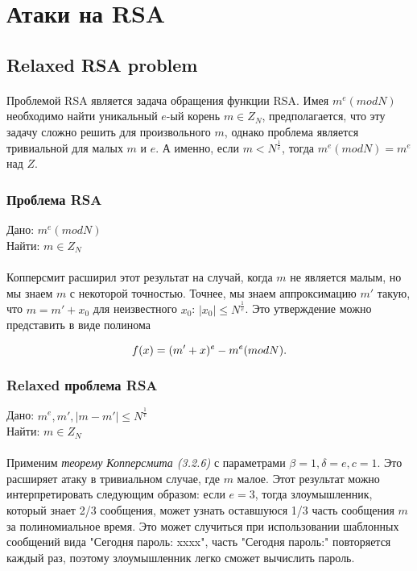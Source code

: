 \section{Атаки на RSA}

\subsection{Relaxed RSA problem}

\paragraph{} Проблемой RSA является задача обращения функции RSA. Имея {$m^e (mod N)$} необходимо найти уникальный {$e$}-ый корень {$m \in Z_N$}, 
  предполагается, что эту задачу сложно решить для произвольного {$m$}, однако проблема является тривиальной для малых {$m$} и {$e$}. А именно, если
  {$m < N^\frac{1}{e}$}, тогда {$m^e (mod N) = m^e$} над {$Z$}.
  
  \subsubsection{Проблема RSA}
  Дано: {$m^e (mod N)$} \\   
  Найти: {$m \in Z_N$}
  
\paragraph{} Копперсмит расширил этот результат на случай, когда {$m$} не является малым, но мы знаем {$m$} с некоторой точностью. Точнее, мы знаем аппроксимацию
  {$m'$} такую, что {$m = m' + x_0$} для неизвестного {$x_0$}: {$|x_0| \le N^\frac{1}{e}$}. Это утверждение можно представить в виде полинома
  
    \begin{equation}
     \textit{{$ f(x) = (m' + x)^e - m^e (mod N) $}}.
    \end{equation}
    
  \subsubsection{Relaxed проблема RSA}
  Дано: {$m^e, m', |m-m'| \le N^\frac{1}{e}$} \\   
  Найти: {$m \in Z_N$}  
  
\paragraph{} Применим \textit{теорему Копперсмита (3.2.6)} с параметрами {$\beta = 1, \delta = e, c = 1$}. Это расширяет атаку в тривиальном случае, где {$m$} малое. Этот
  результат можно интерпретировать следующим образом: если {$e = 3$}, тогда злоумышленник, который знает 2/3 сообщения, может узнать оставшуюся
  1/3 часть сообщения {$m$} за полиномиальное время. Это может случиться при использовании шаблонных сообщений вида "Сегодня пароль: xxxx", часть 
  "Сегодня пароль:" повторяется каждый раз, поэтому злоумышленник легко сможет вычислить пароль.
